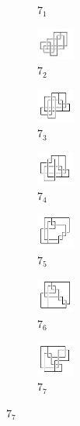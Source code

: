 \documentclass{article}
\theoremstyle{definition}
\theoremstyle{theorem}
\theoremstyle{proposition}
\theoremstyle{corollary}
\begin{document}
\begin{figure}[H]
\begin{subfigure}{0.075\textwidth}
    \caption{$7_{1}$} 
    \end{subfigure}
    \begin{subfigure}{0.075\textwidth}
    \includegraphics[width=1.25cm]{../Midterm_Poster/grid_diagram/handcuff_7_2.png}
    \caption{$7_{2}$} 
    \end{subfigure}
    \begin{subfigure}{0.075\textwidth}
    \includegraphics[width=1.25cm]{../Midterm_Poster/grid_diagram/handcuff_7_3.png}
    \caption{$7_{3}$} 
    \end{subfigure}
    \begin{subfigure}{0.075\textwidth}
    \includegraphics[width=1.25cm]{../Midterm_Poster/grid_diagram/handcuff_7_4.png}
    \caption{$7_{4}$} 
    \end{subfigure}
    \begin{subfigure}{0.075\textwidth}
    \includegraphics[width=1.25cm]{../Midterm_Poster/grid_diagram/handcuff_7_5.png}
    \caption{$7_{5}$} 
    \end{subfigure}
    \begin{subfigure}{0.075\textwidth}
    \includegraphics[width=1.25cm]{../Midterm_Poster/grid_diagram/handcuff_7_6.png}
    \caption{$7_{6}$} 
    \end{subfigure}
    \begin{subfigure}{0.075\textwidth}
    \includegraphics[width=1.25cm]{../Midterm_Poster/grid_diagram/handcuff_7_7.png}
    \caption{$7_{7}$} 
    \end{subfigure}

\end{figure}
\end{document}
